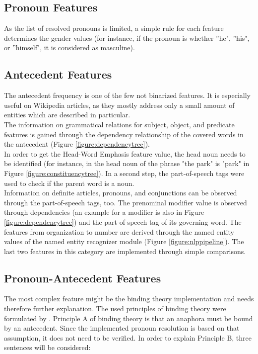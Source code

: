 \subsection{Pronoun Features}
As the list of resolved pronouns is limited, a simple rule for each feature determines the gender values (for instance, if the pronoun is whether ''he", ''his", or ''himself", it is considered as masculine). 

\subsection{Antecedent Features}
The antecedent frequency is one of the few not binarized features. It is especially useful on Wikipedia articles, as they mostly address only a small amount of entities which are described in particular. \\
The information on grammatical relations for subject, object, and predicate features is gained through the dependency relationship of the covered words in the antecedent (Figure  \ref{figure:dependencytree}).\\
In order to get the Head-Word Emphasis feature value, the head noun needs to be identified (for instance, in the head noun of the phrase "the park" is "park" in Figure \ref{figure:constituencytree}). In a second step, the part-of-speech tags were used to check if the parent word is a noun.\\
Information on definite articles, pronouns, and conjunctions can be observed through the part-of-speech tags, too.
The prenominal modifier value is observed through dependencies (an example for a modifier is also in Figure \ref{figure:dependencytree}) and the part-of-speech tag of its governing word. 
The features from organization to number are derived through the named entity values of the named entity recognizer module (Figure \ref{figure:nlppipeline}).
The last two features in this category are implemented through simple comparisons.

\subsection{Pronoun-Antecedent Features}
The most complex feature might be the binding theory implementation and needs therefore further explanation. The used principles of binding theory were formulated by \cite{chomsky1993lectures}. Principle A of binding theory is that an anaphora must be bound by an antecedent. Since the implemented pronoun resolution is based on that assumption, it does not need to be verified. In order to explain Principle B, three sentences will be considered:

